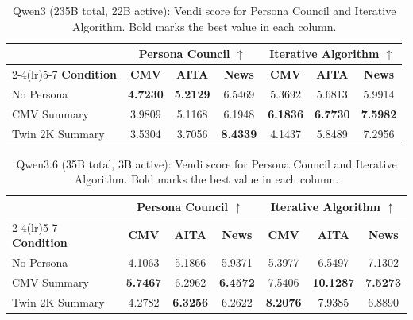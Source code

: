 \begin{table}[H]
\centering
\caption{Qwen3 (235B total, 22B active): Vendi score for Persona Council and Iterative Algorithm. Bold marks the best value in each column.}
\label{tab:model-qwen3}
\small
\begin{tabular}{l|ccc|ccc}
\toprule
& \multicolumn{3}{c|}{\textbf{Persona Council} $\uparrow$} & \multicolumn{3}{c}{\textbf{Iterative Algorithm} $\uparrow$} \\
\cmidrule(lr){2-4}\cmidrule(lr){5-7}
\textbf{Condition} & \textbf{CMV} & \textbf{AITA} & \textbf{News} & \textbf{CMV} & \textbf{AITA} & \textbf{News} \\
\midrule
No Persona & \textbf{4.7230} & \textbf{5.2129} & 6.5469 & 5.3692 & 5.6813 & 5.9914 \\
CMV Summary & 3.9809 & 5.1168 & 6.1948 & \textbf{6.1836} & \textbf{6.7730} & \textbf{7.5982} \\
Twin 2K Summary & 3.5304 & 3.7056 & \textbf{8.4339} & 4.1437 & 5.8489 & 7.2956 \\
\bottomrule
\end{tabular}
\end{table}

\begin{table}[H]
\centering
\caption{Qwen3.6 (35B total, 3B active): Vendi score for Persona Council and Iterative Algorithm. Bold marks the best value in each column.}
\label{tab:model-qwen36}
\small
\begin{tabular}{l|ccc|ccc}
\toprule
& \multicolumn{3}{c|}{\textbf{Persona Council} $\uparrow$} & \multicolumn{3}{c}{\textbf{Iterative Algorithm} $\uparrow$} \\
\cmidrule(lr){2-4}\cmidrule(lr){5-7}
\textbf{Condition} & \textbf{CMV} & \textbf{AITA} & \textbf{News} & \textbf{CMV} & \textbf{AITA} & \textbf{News} \\
\midrule
No Persona & 4.1063 & 5.1866 & 5.9371 & 5.3977 & 6.5497 & 7.1302 \\
CMV Summary & \textbf{5.7467} & 6.2962 & \textbf{6.4572} & 7.5406 & \textbf{10.1287} & \textbf{7.5273} \\
Twin 2K Summary & 4.2782 & \textbf{6.3256} & 6.2622 & \textbf{8.2076} & 7.9385 & 6.8890 \\
\bottomrule
\end{tabular}
\end{table}

